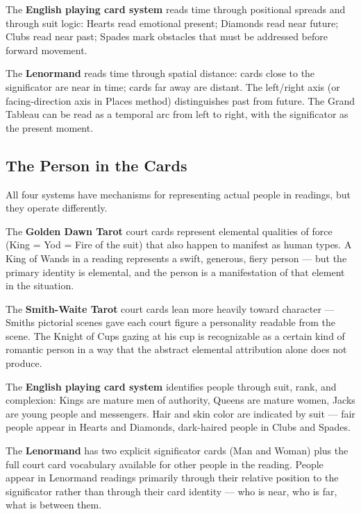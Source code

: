 The \textbf{English playing card system} reads time through positional spreads and through suit logic: Hearts read emotional present; Diamonds read near future; Clubs read near past; Spades mark obstacles that must be addressed before forward movement.

The \textbf{Lenormand} reads time through spatial distance: cards close to the significator are near in time; cards far away are distant. The left/right axis (or facing-direction axis in Place\textquotesingle s method) distinguishes past from future. The Grand Tableau can be read as a temporal arc from left to right, with the significator as the present moment.

\subsection{The Person in the Cards}\label{the-person-in-the-cards}

All four systems have mechanisms for representing actual people in readings, but they operate differently.

The \textbf{Golden Dawn Tarot} court cards represent elemental qualities of force (King = Yod = Fire of the suit) that also happen to manifest as human types. A King of Wands in a reading represents a swift, generous, fiery person --- but the primary identity is elemental, and the person is a manifestation of that element in the situation.

The \textbf{Smith-Waite Tarot} court cards lean more heavily toward character --- Smith\textquotesingle s pictorial scenes gave each court figure a personality readable from the scene. The Knight of Cups gazing at his cup is recognizable as a certain kind of romantic person in a way that the abstract elemental attribution alone does not produce.

The \textbf{English playing card system} identifies people through suit, rank, and complexion: Kings are mature men of authority, Queens are mature women, Jacks are young people and messengers. Hair and skin color are indicated by suit --- fair people appear in Hearts and Diamonds, dark-haired people in Clubs and Spades.

The \textbf{Lenormand} has two explicit significator cards (Man and Woman) plus the full court card vocabulary available for other people in the reading. People appear in Lenormand readings primarily through their relative position to the significator rather than through their card identity --- who is near, who is far, what is between them.

